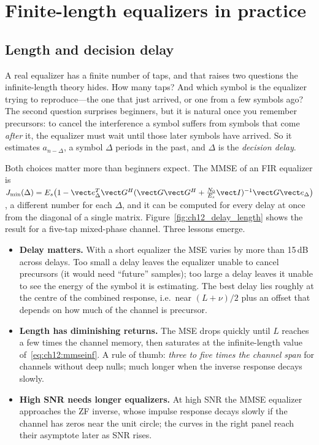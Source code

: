 \section{Finite-length equalizers in practice}
\label{sec:ch12:fir}

\subsection{Length and decision delay}

A real equalizer has a finite number of taps, and that raises two questions the infinite-length
theory hides. How many taps? And which symbol is the equalizer trying to reproduce---the one that
just arrived, or one from a few symbols ago? The second question surprises beginners, but it is
natural once you remember precursors: to cancel the interference a symbol suffers from symbols
that come \emph{after} it, the equalizer must wait until those later symbols have arrived. So it
estimates $a_{n-\Delta}$, a symbol $\Delta$ periods in the past, and $\Delta$ is the
\emph{decision delay}.

Both choices matter more than beginners expect. The MMSE of an FIR equalizer is
$J_{\min}(\Delta)=E_s\big(1-\vect e_\Delta^T\vect G^H(\vect G\vect G^H+\tfrac{N_0}{E_s}\vect I)^{-1}\vect G\vect e_\Delta\big)$,
a different number for each $\Delta$, and it can be computed for every delay at once from the
diagonal of a single matrix. Figure~\ref{fig:ch12_delay_length} shows the result for a
five-tap mixed-phase channel. Three lessons emerge.


\begin{itemize}
\item \textbf{Delay matters.} With a short equalizer the MSE varies by more than 15\,dB across
delays. Too small a delay leaves the equalizer unable to cancel precursors (it would need
``future'' samples); too large a delay leaves it unable to see the energy of the symbol it is
estimating. The best delay lies roughly at the centre of the combined response, i.e.\ near
$(L+\nu)/2$ plus an offset that depends on how much of the channel is precursor.
\item \textbf{Length has diminishing returns.} The MSE drops quickly until $L$ reaches a few
times the channel memory, then saturates at the infinite-length value of~\eqref{eq:ch12:mmseinf}.
A rule of thumb: \emph{three to five times the channel span} for channels without deep nulls; much
longer when the inverse response decays slowly.
\item \textbf{High SNR needs longer equalizers.} At high SNR the MMSE equalizer approaches the ZF
inverse, whose impulse response decays slowly if the channel has zeros near the unit circle; the
curves in the right panel reach their asymptote later as SNR rises.
\end{itemize}

